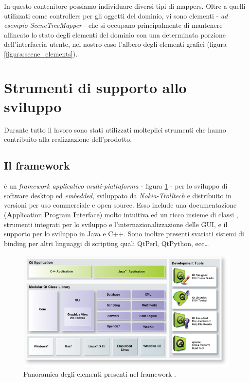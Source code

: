 In questo contenitore possiamo individuare diversi tipi di mappers. Oltre a quelli utilizzati come controllers per gli oggetti del dominio, vi sono elementi - \emph{ad esempio SceneTreeMapper} - che si occupano principalmente di mantenere allineato lo stato degli elementi del dominio con una determinata porzione dell'interfaccia utente, nel nostro caso l'albero degli elementi grafici (figura \ref{figura:scene_elements}).

\section{Strumenti di supporto allo sviluppo}
Durante tutto il lavoro sono stati utilizzati molteplici strumenti che hanno contribuito alla realizzazione dell'prodotto.

\subsection{Il framework \qt{}}
\qt{} è un \emph{framework applicativo multi-piattaforma} - figura \ref{figura:qtframework} - per lo sviluppo di software desktop ed \emph{embedded}, sviluppato da \emph{Nokia-Trolltech} e distribuito in versioni per uso commerciale e open source. Esso include una documentazione (\textbf{A}pplication \textbf{P}rogram \textbf{I}nterface) molto intuitiva ed un ricco insieme di classi \cpp{}, strumenti integrati per lo sviluppo e l'internazionalizzazione delle GUI, e il supporto per lo sviluppo in Java e C++. Sono inoltre presenti svariati sistemi di binding per altri linguaggi di scripting quali QtPerl, QtPython, ecc\ldots

\begin{figure}[hbt]
	\centering
	\includegraphics[width=12cm]{images/qtframework.png}
	\caption{Panoramica degli elementi presenti nel framework \qt{}.}
	\label{figura:qtframework}
\end{figure}

